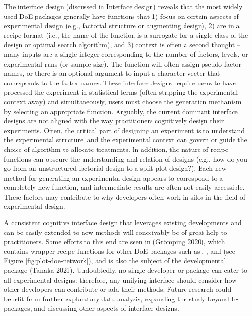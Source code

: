 The interface design (discussed in \hyperref[design]{Interface design}) reveals that the most widely used DoE packages generally have functions that 1) focus on certain aspects of experimental design (e.g., factorial structure or augmenting design), 2) are in a recipe format (i.e., the name of the function is a surrogate for a single class of the design or optimal search algorithm), and 3) context is often a second thought -- many inputs are a single integer corresponding to the number of factors, levels, or experimental runs (or sample size). The function will often assign pseudo-factor names, or there is an optional argument to input a character vector that corresponds to the factor names. These interface designs require users to have processed the experiment in statistical terms (often stripping the experimental context away) and simultaneously, users must choose the generation mechanism by selecting an appropriate function. Arguably, the current dominant interface designs are not aligned with the way practitioners cognitively design their experiments. Often, the critical part of designing an experiment is to understand the experimental structure, and the experimental context can govern or guide the choice of algorithm to allocate treatments. In addition, the nature of recipe functions can obscure the understanding and relation of designs (e.g., how do you go from an unstructured factorial design to a split plot design?). Each new method for generating an experimental design appears to correspond to a completely new function, and intermediate results are often not easily accessible. These factors may contribute to why developers often work in silos in the field of experimental design.

A consistent cognitive interface design that leverages existing developments and can be easily extended to new methods will conceivably be of great help to practitioners. Some efforts to this end are seen in  (Grömping 2020), which contains wrapper recipe functions for other DoE packages such as , , and  (see Figure \ref{fig:plot-doe-network}), and is also the subject of the developmental package  (Tanaka 2021). Undoubtedly, no single developer or package can cater to all experimental designs; therefore, any unifying interface should consider how other developers can contribute or add their methods. Future research could benefit from further exploratory data analysis, expanding the study beyond R-packages, and discussing other aspects of interface designs.

